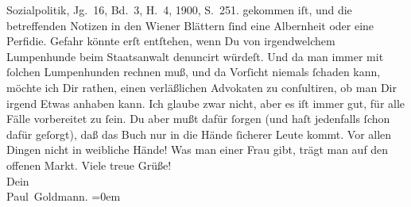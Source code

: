 \begin{ledgroupsized}[t]{13cm}
{{{{                        Sozialpolitik}, Jg. 16, Bd. 3, H. 4, 1900,
                     S. 251.}}}\label{K_L02913-1h} gekommen iſt, und die betreffenden Notizen in den Wiener Blättern ſind eine Albernheit oder eine
               Perfidie. Gefahr könnte erſt entſtehen, wenn Du von irgendwelchem Lumpenhunde beim
                   Staatsanwalt denuncirt würdeſt. Und da man
               immer mit ſolchen Lumpenhunden rechnen muß, und da Vorſicht niemals ſchaden kann, {\pb}möchte ich Dir rathen, einen verläßlichen Advokaten
               zu conſultiren, ob man Dir irgend Etwas anhaben kann. Ich glaube zwar nicht, aber es
               iſt immer gut, für alle Fälle  vorbereitet zu ſein.
               Du aber mußt dafür ſorgen (und haſt jedenfalls ſchon dafür geſorgt), daß das Buch nur in die Hände ſicherer
               Leute kommt. Vor allen  Dingen nicht in weibliche
               Hände! Was man einer Frau gibt, trägt man auf den offenen Markt. \label{K_L02913-11v}\label{K_L02913-11h}\pend
           \pstart
           Viele treue Grüße! {\\[\baselineskip]}Dein {\\[\baselineskip]}\spacefill\mbox{Paul Goldmann.}\pend
           \leftskip=0em{}
         
         \endnumbering{}\end{ledgroupsized}  \newcommand{\dateiname}{L02913}\newcommand{\titel}{Paul Goldmann an Arthur Schnitzler, 27. 4. [1900]}\newcommand{\editorInnen}{Martin Anton Müller und Laura Untner}
      